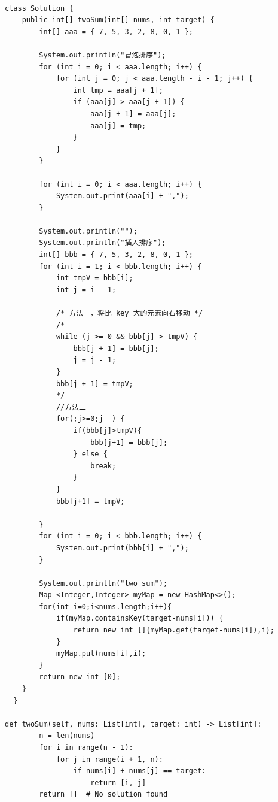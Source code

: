 \documentclass[10pt]{article}
\begin{document}
\newpage %
\begin{multicols}{2}
\begin{lstlisting}[style=java, caption={}]

class Solution {
    public int[] twoSum(int[] nums, int target) {
        int[] aaa = { 7, 5, 3, 2, 8, 0, 1 };

        System.out.println("冒泡排序");
        for (int i = 0; i < aaa.length; i++) {
            for (int j = 0; j < aaa.length - i - 1; j++) {
                int tmp = aaa[j + 1];
                if (aaa[j] > aaa[j + 1]) {
                    aaa[j + 1] = aaa[j];
                    aaa[j] = tmp;
                }
            }
        }

        for (int i = 0; i < aaa.length; i++) {
            System.out.print(aaa[i] + ",");
        }

        System.out.println("");
        System.out.println("插入排序");
        int[] bbb = { 7, 5, 3, 2, 8, 0, 1 };
        for (int i = 1; i < bbb.length; i++) {
            int tmpV = bbb[i];
            int j = i - 1;

            /* 方法一，将比 key 大的元素向右移动 */
            /*
            while (j >= 0 && bbb[j] > tmpV) {
                bbb[j + 1] = bbb[j];
                j = j - 1;
            }
            bbb[j + 1] = tmpV;
            */
            //方法二
            for(;j>=0;j--) {
                if(bbb[j]>tmpV){
                    bbb[j+1] = bbb[j];
                } else {
                    break;
                }
            }
            bbb[j+1] = tmpV;

        }
        for (int i = 0; i < bbb.length; i++) {
            System.out.print(bbb[i] + ",");
        }

        System.out.println("two sum");
        Map <Integer,Integer> myMap = new HashMap<>();
        for(int i=0;i<nums.length;i++){
            if(myMap.containsKey(target-nums[i])) {
                return new int []{myMap.get(target-nums[i]),i};
            }
            myMap.put(nums[i],i);
        }
        return new int [0];
    }
  }

def twoSum(self, nums: List[int], target: int) -> List[int]:
        n = len(nums)
        for i in range(n - 1):
            for j in range(i + 1, n):
                if nums[i] + nums[j] == target:
                    return [i, j]
        return []  # No solution found



\end{lstlisting}
\end{multicols}
\end{document}
